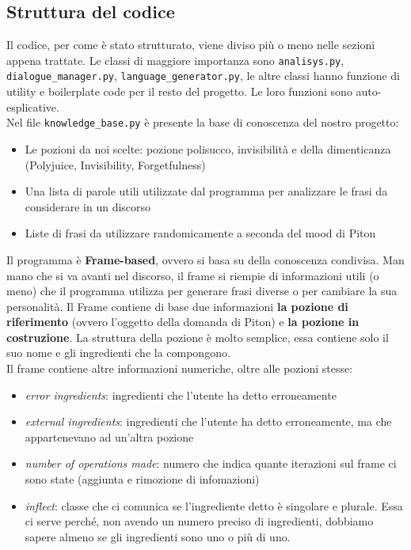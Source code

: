 \subsection{Struttura del codice}
Il codice, per come è stato strutturato, viene diviso più o meno nelle sezioni appena trattate. Le classi di maggiore importanza sono \texttt{analisys.py}, \texttt{dialogue\_manager.py}, \texttt{language\_generator.py}, le altre classi hanno funzione di utility e boilerplate code per il resto del progetto. Le loro funzioni sono auto-esplicative.
\\
Nel file \texttt{knowledge\_base.py} è presente la base di conoscenza del nostro progetto:
\begin{itemize}
    \item Le pozioni da noi scelte: pozione polisucco, invisibilità e della dimenticanza (Polyjuice, Invisibility, Forgetfulness)
    \item Una lista di parole utili utilizzate dal programma per analizzare le frasi da considerare in un discorso
    \item Liste di frasi da utilizzare randomicamente a seconda del mood di Piton
\end{itemize}
Il programma è \textbf{Frame-based}, ovvero si basa su della conoscenza condivisa. Man mano che si va avanti nel discorso, il frame si riempie di informazioni utili (o meno) che il programma utilizza per generare frasi diverse o per cambiare la sua personalità. Il Frame contiene di base due informazioni \textbf{la pozione di riferimento} (ovvero l'oggetto della domanda di Piton) e \textbf{la pozione in costruzione}.
La struttura della pozione è molto semplice, essa contiene solo il suo nome e gli ingredienti che la compongono.
\\
Il frame contiene altre informazioni numeriche, oltre alle pozioni stesse:
\begin{itemize}
    \item \textit{error ingredients}: ingredienti che l'utente ha detto erroneamente
    \item \textit{external ingredients}: ingredienti che l'utente ha detto erroneamente, ma che appartenevano ad un'altra pozione
    \item \textit{number of operations made}: numero che indica quante iterazioni sul frame ci sono state (aggiunta e rimozione di infomazioni)
    \item \textit{inflect}: classe che ci comunica se l'ingrediente detto è singolare e plurale. Essa ci serve perché, non avendo un numero preciso di ingredienti, dobbiamo sapere almeno se gli ingredienti sono uno o più di uno.
\end{itemize}